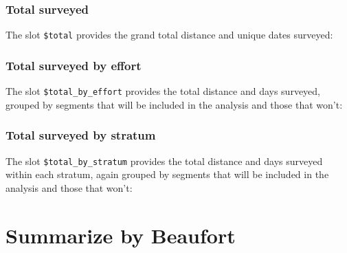 \documentclass[
]{book}
\newenvironment{Shaded}{\begin{snugshade}}{\end{snugshade}}
\newcommand{\DataTypeTok}[1]{\textcolor[rgb]{0.13,0.29,0.53}{#1}}
\newcommand{\KeywordTok}[1]{\textcolor[rgb]{0.13,0.29,0.53}{\textbf{#1}}}
\newcommand{\NormalTok}[1]{#1}
\newcommand{\OperatorTok}[1]{\textcolor[rgb]{0.81,0.36,0.00}{\textbf{#1}}}
\newcommand{\StringTok}[1]{\textcolor[rgb]{0.31,0.60,0.02}{#1}}
\begin{document}
\hypertarget{total-surveyed}{%
\subsubsection*{Total surveyed}\label{total-surveyed}}

The slot \texttt{\$total} provides the grand total distance and unique dates surveyed:

\begin{Shaded}
\end{Shaded}

\hypertarget{total-surveyed-by-effort}{%
\subsubsection*{Total surveyed by effort}\label{total-surveyed-by-effort}}

The slot \texttt{\$total\_by\_effort} provides the total distance and days surveyed, grouped by segments that will be included in the analysis and those that won't:

\hypertarget{total-surveyed-by-stratum}{%
\subsubsection*{Total surveyed by stratum}\label{total-surveyed-by-stratum}}

The slot \texttt{\$total\_by\_stratum} provides the total distance and days surveyed within each stratum, again grouped by segments that will be included in the analysis and those that won't:

\hypertarget{summarize-by-beaufort}{%
\section*{Summarize by Beaufort}\label{summarize-by-beaufort}}
\end{document}
